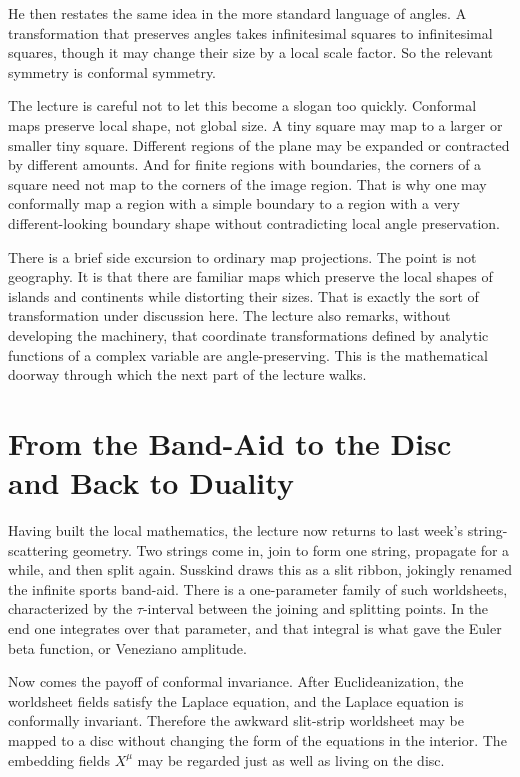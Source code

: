 He then restates the same idea in the more standard language of angles. A transformation that preserves angles takes infinitesimal squares to infinitesimal squares, though it may change their size by a local scale factor. So the relevant symmetry is conformal symmetry.

The lecture is careful not to let this become a slogan too quickly. Conformal maps preserve local shape, not global size. A tiny square may map to a larger or smaller tiny square. Different regions of the plane may be expanded or contracted by different amounts. And for finite regions with boundaries, the corners of a square need not map to the corners of the image region. That is why one may conformally map a region with a simple boundary to a region with a very different-looking boundary shape without contradicting local angle preservation.

There is a brief side excursion to ordinary map projections. The point is not geography. It is that there are familiar maps which preserve the local shapes of islands and continents while distorting their sizes. That is exactly the sort of transformation under discussion here. The lecture also remarks, without developing the machinery, that coordinate transformations defined by analytic functions of a complex variable are angle-preserving. This is the mathematical doorway through which the next part of the lecture walks.

\section{From the Band-Aid to the Disc and Back to Duality}

Having built the local mathematics, the lecture now returns to last week's string-scattering geometry. Two strings come in, join to form one string, propagate for a while, and then split again. Susskind draws this as a slit ribbon, jokingly renamed the infinite sports band-aid. There is a one-parameter family of such worldsheets, characterized by the \(\tau\)-interval between the joining and splitting points. In the end one integrates over that parameter, and that integral is what gave the Euler beta function, or Veneziano amplitude.

Now comes the payoff of conformal invariance. After Euclideanization, the worldsheet fields satisfy the Laplace equation, and the Laplace equation is conformally invariant. Therefore the awkward slit-strip worldsheet may be mapped to a disc without changing the form of the equations in the interior. The embedding fields \(X^\mu\) may be regarded just as well as living on the disc.

